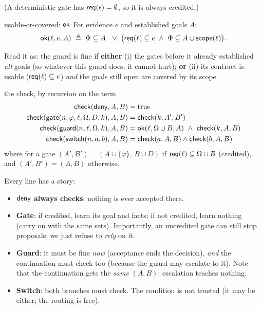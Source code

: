 (A deterministic gate has $\mathsf{req}(\epsilon)=\emptyset$, so it is always credited.)

\begin{defbox}{usable-or-covered: $\mathsf{ok}$}
For evidence $e$ and established goals $A$:
\[
\mathsf{ok}(\ell,e,A)\ \triangleq\ \Phi\subseteq A\ \ \vee\ \bigl(\mathsf{req}(\ell)\subseteq e\ \wedge\ \Phi\subseteq A\cup\mathsf{scope}(\ell)\bigr).
\]
\end{defbox}

Read it as: the guard is fine if \textbf{either} (i) the gates before it already established \emph{all} goals (so whatever this guard does, it cannot hurt); \textbf{or} (ii) its contract is usable ($\mathsf{req}(\ell)\subseteq e$) \emph{and} the goals still open are covered by its scope.

\begin{defbox}{the check, by recursion on the term}
\begin{align*}
\chk(\deny,A,B)&=\mathrm{true}\\
\chk(\gate(n,\varphi,\ell,\Omega,D,k),A,B)&=\chk(k,A',B')\\
\chk(\guard(n,\ell,\Omega,k),A,B)&=\ok(\ell,\Omega\cup B,A)\ \wedge\ \chk(k,A,B)\\
\chk(\switch(n,a,b),A,B)&=\chk(a,A,B)\wedge\chk(b,A,B)
\end{align*}
where for a gate $(A',B')=(A\cup\{\varphi\},\,B\cup D)$ if $\mathsf{req}(\ell)\subseteq\Omega\cup B$ (credited), and $(A',B')=(A,B)$ otherwise.
\end{defbox}

Every line has a story:

\begin{itemize}
\item \textbf{$\mathsf{deny}$ always checks}: nothing is ever accepted there.
\item \textbf{Gate}: if credited, learn its goal and facts; if not credited, learn nothing (carry on with the same sets). Importantly, an uncredited gate can still stop proposals; we just refuse to \emph{rely} on it.
\item \textbf{Guard}: it must be fine \emph{now} (acceptance ends the decision), \emph{and} the continuation must check too (because the guard may escalate to it). Note that the continuation gets the \emph{same} $(A,B)$: escalation teaches nothing.
\item \textbf{Switch}: both branches must check. The condition is not trusted (it may be either; the routing is free).
\end{itemize}

